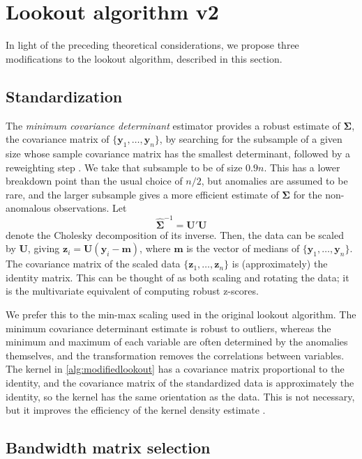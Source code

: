 \section{Lookout algorithm v2}\label{sec:modified}

In light of the preceding theoretical considerations, we propose three modifications to the lookout algorithm, described in this section.

\subsection{Standardization}

The \emph{minimum covariance determinant} estimator provides a robust estimate of $\bm{\Sigma}$, the covariance matrix of $\{\bm{y}_1,\dots,\bm{y}_n\}$, by searching for the subsample of a given size whose sample covariance matrix has the smallest determinant, followed by a reweighting step \citep{rousseeuw1999fast}. We take that subsample to be of size $0.9n$. This has a lower breakdown point than the usual choice of $n/2$, but anomalies are assumed to be rare, and the larger subsample gives a more efficient estimate of $\bm{\Sigma}$ for the non-anomalous observations. Let
\begin{equation}\label{eq:mcd}
  \hat{\bm{\Sigma}}^{-1} = \bm{U}' \bm{U}
\end{equation}
denote the Cholesky decomposition of its inverse. Then, the data can be scaled by $\bm{U}$, giving $\bm{z}_i = \bm{U}(\bm{y}_i - \bm{m})$, where $\bm{m}$ is the vector of medians of $\{\bm{y}_1,\dots,\bm{y}_n\}$. The covariance matrix of the scaled data $\{\bm{z}_1,\dots,\bm{z}_n\}$ is (approximately) the identity matrix. This can be thought of as both scaling and rotating the data; it is the multivariate equivalent of computing robust z-scores.

We prefer this to the min-max scaling used in the original lookout algorithm. The minimum covariance determinant estimate is robust to outliers, whereas the minimum and maximum of each variable are often determined by the anomalies themselves, and the transformation removes the correlations between variables. The kernel in \cref{alg:modifiedlookout} has a covariance matrix proportional to the identity, and the covariance matrix of the standardized data is approximately the identity, so the kernel has the same orientation as the data. This is not necessary, but it improves the efficiency of the kernel density estimate \citep{chacon2018multivariate}.

\subsection{Bandwidth matrix selection}

